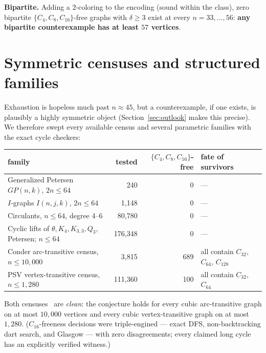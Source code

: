 \documentclass[11pt]{article}
\theoremstyle{remark}
\newcommand{\Cyc}[1]{C_{#1}}
\begin{document}
\textbf{Bipartite.} Adding a $2$-coloring to the encoding (sound within the
class), zero bipartite $\{\Cyc4,\Cyc8,\Cyc{16}\}$-free graphs with
$\delta\ge3$ exist at every $n = 33, \dots, 56$: \textbf{any bipartite
counterexample has at least $57$ vertices}.

\section{Symmetric censuses and structured families}
\label{sec:census}

Exhaustion is hopeless much past $n \approx 45$, but a counterexample, if
one exists, is plausibly a highly symmetric object (Section~\ref{sec:outlook}
makes this precise). We therefore swept every available census and several
parametric families with the exact cycle checkers:

\begin{center}
\begin{tabular}{lrrl}
\toprule
family & tested & $\{\Cyc4,\Cyc8,\Cyc{16}\}$-free & fate of survivors \\
\midrule
Generalized Petersen $GP(n,k)$, $2n\le64$ & 240 & 0 & --- \\
$I$-graphs $I(n,j,k)$, $2n\le64$ & 1{,}148 & 0 & --- \\
Circulants, $n\le64$, degree 4--6 & 80{,}780 & 0 & --- \\
Cyclic lifts of $\theta, K_4, K_{3,3}, Q_3$, Petersen; $n\le64$ & 176{,}348 & 0 & --- \\
Conder arc-transitive census, $n\le10{,}000$ & 3{,}815 & 689 & all contain $\Cyc{32}$, $\Cyc{64}$, $\Cyc{128}$ \\
PSV vertex-transitive census, $n\le1{,}280$ & 111{,}360 & 100 & all contain $\Cyc{32}$, $\Cyc{64}$ \\
\bottomrule
\end{tabular}
\end{center}

Both censuses~\cite{Conder,PSV13} are \emph{clean}: the conjecture holds for
every cubic arc-transitive graph on at most $10{,}000$ vertices and every
cubic vertex-transitive graph on at most $1{,}280$. ($\Cyc{16}$-freeness
decisions were triple-engined --- exact DFS, non-backtracking dart search,
and Glasgow --- with zero disagreements; every claimed long cycle has an
explicitly verified witness.)
\end{document}
